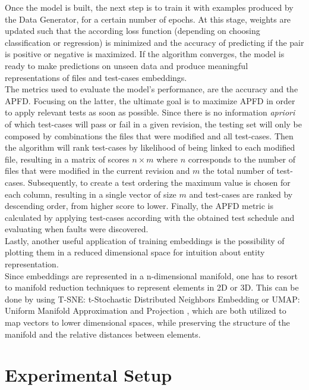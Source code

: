 Once the model is built, the next step is to train it with examples produced by the Data Generator, for a certain number of epochs. At this stage, weights are updated such that the according loss function (depending on choosing classification or regression) is minimized and the accuracy of predicting if the pair is positive or negative is maximized. If the algorithm converges, the model is ready to make predictions on unseen data and produce meaningful representations of files and test-cases embeddings.
\\

The metrics used to evaluate the model's performance, are the accuracy and the APFD. Focusing on the latter, the ultimate goal is to maximize APFD in order to apply relevant tests as soon as possible. 
Since there is no information \textit{apriori} of which test-cases will pass or fail in a given revision, the testing set will only be composed by combinations the files that were modified and all test-cases. Then the algorithm will rank test-cases by likelihood of being linked to each modified file, resulting in a matrix of scores $n \times m$ where $n$ corresponds to the number of files that were modified in the current revision and $m$ the total number of test-cases.  
Subsequently, to create a test ordering the maximum value is chosen for each column, resulting in a single vector of size $m$ and test-cases are ranked by descending order, from higher score to lower. Finally, the APFD metric is calculated by applying test-cases according with the obtained test schedule and evaluating when faults were discovered.
\\

Lastly, another useful application of training embeddings is the possibility of plotting them in a reduced dimensional space for intuition about entity representation. 
\\

Since embeddings are represented in a n-dimensional manifold, one has to resort to manifold reduction techniques to represent elements in 2D or 3D. This can be done by using T-SNE: t-Stochastic Distributed Neighbors Embedding \cite{tsne} or UMAP: Uniform Manifold Approximation and Projection \cite{umap}, which are both utilized to map vectors to lower dimensional spaces, while preserving the structure of the manifold and the relative distances between elements.


\section{Experimental Setup}

